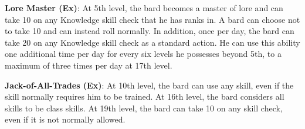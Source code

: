 \textbf{Lore Master (Ex)}: At 5th level, the bard becomes a master of lore and can take 10 on any Knowledge skill check that he has ranks in. A bard can choose not to take 10 and can instead roll normally. In addition, once per day, the bard can take 20 on any Knowledge skill check as a standard action. He can use this ability one additional time per day for every six levels he possesses beyond 5th, to a maximum of three times per day at 17th level.
				
\textbf{Jack-of-All-Trades (Ex)}: At 10th level, the bard can use any skill, even if the skill normally requires him to be trained. At 16th level, the bard considers all skills to be class skills. At 19th level, the bard can take 10 on any skill check, even if it is not normally allowed.
        	
